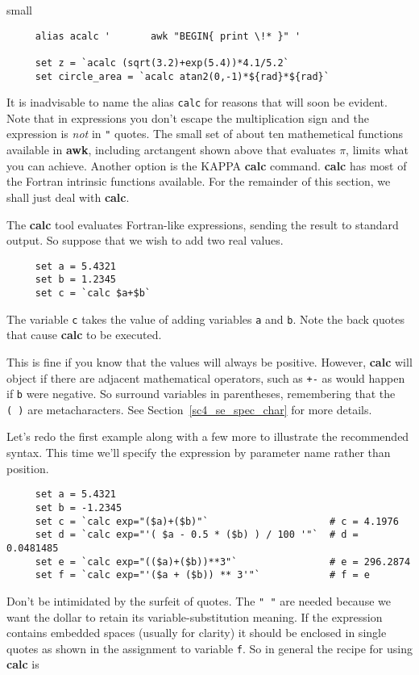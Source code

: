 \documentclass[twoside,11pt]{article}
\newcommand{\htmlref}[2]{#1}
\newcommand{\xref}[3]{#1}
\newcommand{\latexelsehtml}[2]{#1}
\newcommand{\latexelsehtml}[2]{#2}
\newcommand{\KAPPAref}{\xref{{\footnotesize KAPPA}}{sun95}{}}
\begin{document}
small
\begin{verbatim}
     alias acalc '       awk "BEGIN{ print \!* }" '

     set z = `acalc (sqrt(3.2)+exp(5.4))*4.1/5.2`
     set circle_area = `acalc atan2(0,-1)*${rad}*${rad}`
\end{verbatim}
\normalsize
It is inadvisable to name the alias {\tt calc} for reasons that will
soon be evident.  Note that in expressions you don't escape the
multiplication sign and the expression is {\em not} in {\tt{"}} quotes.
The small set of about ten mathemetical functions available in {\bf
awk}, including arctangent shown above that evaluates $\pi$, limits
what you can achieve.  Another option is the {\KAPPAref} \xref{{\bf
calc}}{sun95}{CALC} command.  {\bf calc} has most of the Fortran
intrinsic functions available.  For the remainder of this section, we
shall just deal with {\bf calc}.

The {\bf calc} tool evaluates Fortran-like expressions, sending the
result to \htmlref{{\sf standard output}}{sc4_gl_std_out}.  So suppose
that we wish to add two real values.

\small
\begin{verbatim}
     set a = 5.4321
     set b = 1.2345
     set c = `calc $a+$b`
\end{verbatim}
\normalsize
The variable {\tt c} takes the value of adding variables {\tt a} and
{\tt b}.  Note the back quotes that cause {\bf calc} to be executed.

This is fine if you know that the values will always be positive.
However, {\bf calc} will object if there are adjacent mathematical
operators, such as {\tt +-} as would happen if {\tt b} were negative.
So surround variables in parentheses, remembering that the {\tt (~)} are
\htmlref{{\sf metacharacters}}{sc4_gl_met}. 
\latexelsehtml{See Section~\ref{sc4_se_spec_char}}{Click
\htmlref{here}{sc4_se_spec_char}} for more details.

Let's redo the first example along with a few more to illustrate the
recommended syntax.  This time we'll specify the expression by parameter
name rather than position.

\small
\begin{verbatim}
     set a = 5.4321
     set b = -1.2345
     set c = `calc exp="($a)+($b)"`                     # c = 4.1976
     set d = `calc exp="'( $a - 0.5 * ($b) ) / 100 '"`  # d = 0.0481485
     set e = `calc exp="(($a)+($b))**3"`                # e = 296.2874
     set f = `calc exp="'($a + ($b)) ** 3'"`            # f = e
\end{verbatim}
\normalsize
Don't be intimidated by the surfeit of quotes.  The {\tt "~"} are needed
because we want the dollar to retain its variable-substitution meaning.
If the expression contains embedded spaces (usually for clarity) it
should be enclosed in single quotes as shown in the assignment to
variable {\tt f}.  So in general the recipe for using {\bf calc} is
\end{document}
